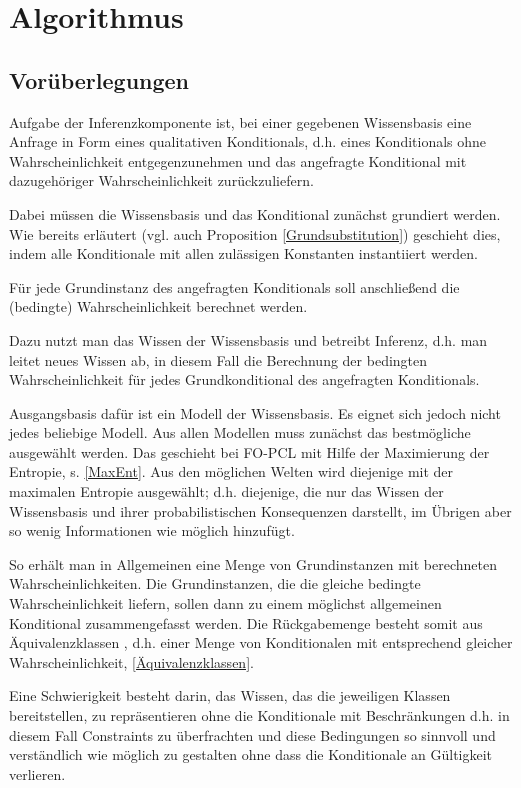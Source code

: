 \documentclass[a4paper, 11pt]{book}
\begin{document}
\chapter{Algorithmus} \label{Alg}

\section{Vorüberlegungen}
Aufgabe der Inferenzkomponente ist, bei einer gegebenen Wissensbasis eine Anfrage in Form eines qualitativen Konditionals, d.h. eines Konditionals ohne Wahrscheinlichkeit entgegenzunehmen und das angefragte Konditional mit dazugehöriger Wahrscheinlichkeit zurückzuliefern.

Dabei müssen die Wissensbasis und das Konditional zunächst grundiert werden. Wie bereits erläutert (vgl. auch Proposition \ref{Grundsubstitution}) geschieht dies, indem alle Konditionale mit allen zulässigen Konstanten instantiiert werden.

Für jede Grundinstanz des angefragten Konditionals soll anschließend die (bedingte) Wahrscheinlichkeit berechnet werden.

Dazu nutzt man das Wissen der Wissensbasis und betreibt Inferenz, d.h. man leitet neues Wissen ab,  in diesem Fall die Berechnung der bedingten Wahrscheinlichkeit für jedes Grundkonditional des angefragten Konditionals.

Ausgangsbasis dafür ist ein Modell der Wissensbasis. Es eignet sich jedoch nicht jedes beliebige Modell. Aus allen Modellen muss zunächst das bestmögliche ausgewählt werden.
Das geschieht bei FO-PCL mit Hilfe der Maximierung der Entropie, s. \ref{MaxEnt}. Aus den möglichen Welten wird diejenige mit der maximalen Entropie ausgewählt; d.h. diejenige, die nur das Wissen der Wissensbasis und ihrer probabilistischen Konsequenzen darstellt, im Übrigen aber so wenig Informationen wie möglich hinzufügt.

So erhält man in Allgemeinen eine Menge von Grundinstanzen mit berechneten Wahrscheinlichkeiten.
Die Grundinstanzen, die die gleiche bedingte Wahrscheinlichkeit liefern, sollen dann zu einem möglichst allgemeinen Konditional zusammengefasst werden. Die Rückgabemenge besteht somit aus Äquivalenzklassen  , d.h. einer Menge von Konditionalen mit entsprechend gleicher Wahrscheinlichkeit, \ref{Äquivalenzklassen}. 

Eine Schwierigkeit besteht darin, das Wissen, das die jeweiligen Klassen bereitstellen, zu repräsentieren ohne die Konditionale mit Beschränkungen d.h. in diesem Fall Constraints zu überfrachten und diese Bedingungen so sinnvoll und verständlich wie möglich zu gestalten ohne dass die Konditionale an Gültigkeit verlieren.
\end{document}
